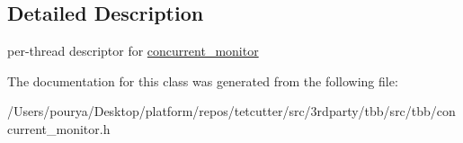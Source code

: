 \subsection{Detailed Description}
per-\/thread descriptor for \hyperlink{classtbb_1_1internal_1_1concurrent__monitor}{concurrent\+\_\+monitor} 

The documentation for this class was generated from the following file\+:\begin{DoxyCompactItemize}
\item 
/\+Users/pourya/\+Desktop/platform/repos/tetcutter/src/3rdparty/tbb/src/tbb/concurrent\+\_\+monitor.\+h\end{DoxyCompactItemize}
